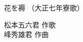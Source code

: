 \documentclass[10pt,b5j]{tarticle} %
\begin{document}
\begin{minipage}[c]{0.7\hsize} %
    \begin{center}
        {\LARGE
            花を褥 %
        }
        {\small 
            （大正七年寮歌） %
        }
    \end{center}
\end{minipage}
\begin{minipage}[c]{0.3\hsize} %
    \begin{flushright} %
        松本五六君 作歌\\峰秀雄君 作曲 %
    \end{flushright}
\end{minipage}
\end{document}

